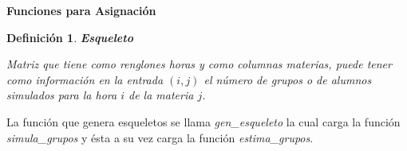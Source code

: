 \documentclass[letterpaper,12pt,spanish]{report} %
\newtheorem{defn}{Definición}[chapter] %
\begin{document}
\begin{center}
\textbf{Funciones para Asignación}
\end{center}

\begin{defn} %
\textbf{Esqueleto}

Matriz que tiene como renglones horas y como columnas materias, puede tener como información en la entrada $(i,j)$ el número de grupos o de alumnos simulados para la hora $i$ de la materia $j$.
\end{defn}

La función que genera esqueletos se llama \textit{gen\_esqueleto} la cual carga la función \textit{simula\_grupos} y ésta a su vez carga la función \textit{estima\_grupos}.
\end{document}
